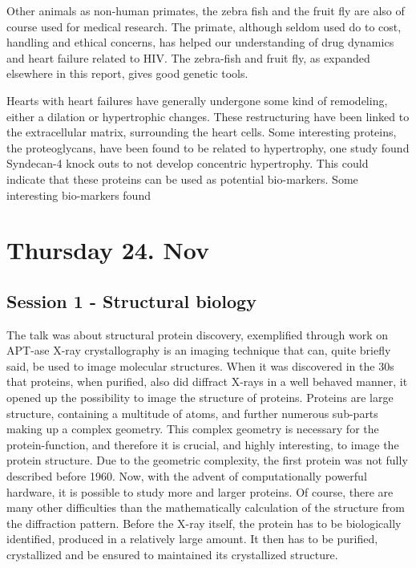 \documentclass[12p]{article}
\begin{document}
Other animals as non-human primates, the zebra fish and the fruit fly are also of course used for medical research.
The primate, although seldom used do to cost, handling and ethical concerns, has helped our understanding of drug dynamics and heart failure related to HIV.
The zebra-fish and fruit fly, as expanded elsewhere in this report, gives good genetic tools.

Hearts with heart failures have generally undergone some kind of remodeling, either a dilation or hypertrophic changes.
These restructuring have been linked to the extracellular matrix, surrounding the heart cells.
Some interesting proteins, the proteoglycans, have been found to be related to hypertrophy, one study found Syndecan-4 knock outs to not develop concentric hypertrophy.
This could indicate that these proteins can be used as potential bio-markers.
Some interesting bio-markers found 

\section*{Thursday 24. Nov}

\subsection*{Session 1 - Structural biology}

The talk was about structural protein discovery, exemplified through work on APT-ase
X-ray crystallography is an imaging technique that can, quite briefly said, be used to image molecular structures.
When it was discovered in the 30s that proteins, when purified, also did diffract X-rays in a well behaved manner, it opened up the possibility to image the structure of proteins.
Proteins are large structure, containing a multitude of atoms, and further numerous sub-parts making up a complex geometry.
This complex geometry is necessary for the protein-function, and therefore it is crucial, and highly interesting, to image the protein structure.
Due to the geometric complexity, the first protein was not fully described before 1960.
Now, with the advent of computationally  powerful hardware, it is possible to study more and larger proteins.
Of course, there are many other difficulties than the mathematically calculation of the structure from the diffraction pattern.
Before the X-ray itself, the protein has to be biologically identified, produced in a relatively large amount.
It then has to be purified, crystallized and be ensured to maintained its crystallized structure.
\end{document}

